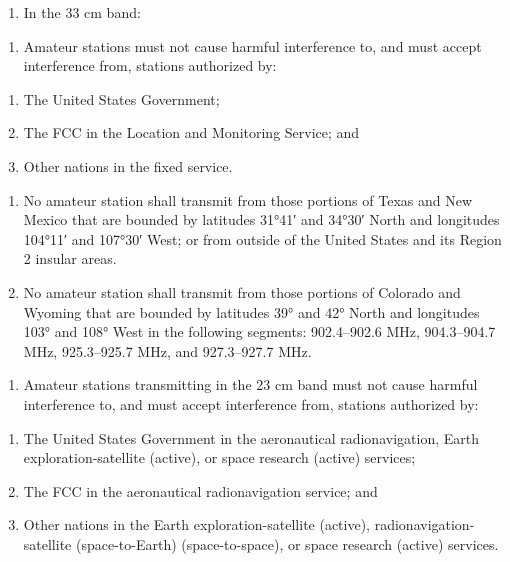 \documentclass[
  letterpaper,
  DIV=11,
  numbers=noendperiod]{scrreport}
\providecommand{\tightlist}{%
  \setlength{\itemsep}{0pt}\setlength{\parskip}{0pt}}\usepackage{longtable,booktabs,array}
\begin{document}
\begin{enumerate}
\def\labelenumi{(\alph{enumi})}
\setcounter{enumi}{13}
\tightlist
\item
  In the 33 cm band:
\end{enumerate}

\begin{enumerate}
\def\labelenumi{(\arabic{enumi})}
\tightlist
\item
  Amateur stations must not cause harmful interference to, and must
  accept interference from, stations authorized by:
\end{enumerate}

\begin{enumerate}
\def\labelenumi{(\roman{enumi})}
\item
  The United States Government;
\item
  The FCC in the Location and Monitoring Service; and
\item
  Other nations in the fixed service.
\end{enumerate}

\begin{enumerate}
\def\labelenumi{(\arabic{enumi})}
\setcounter{enumi}{1}
\item
  No amateur station shall transmit from those portions of Texas and New
  Mexico that are bounded by latitudes 31°41′ and 34°30′ North and
  longitudes 104°11′ and 107°30′ West; or from outside of the United
  States and its Region 2 insular areas.
\item
  No amateur station shall transmit from those portions of Colorado and
  Wyoming that are bounded by latitudes 39° and 42° North and longitudes
  103° and 108° West in the following segments: 902.4--902.6 MHz,
  904.3--904.7 MHz, 925.3--925.7 MHz, and 927.3--927.7 MHz.
\end{enumerate}

\begin{enumerate}
\def\labelenumi{(\alph{enumi})}
\setcounter{enumi}{14}
\tightlist
\item
  Amateur stations transmitting in the 23 cm band must not cause harmful
  interference to, and must accept interference from, stations
  authorized by:
\end{enumerate}

\begin{enumerate}
\def\labelenumi{(\arabic{enumi})}
\item
  The United States Government in the aeronautical radionavigation,
  Earth exploration-satellite (active), or space research (active)
  services;
\item
  The FCC in the aeronautical radionavigation service; and
\item
  Other nations in the Earth exploration-satellite (active),
  radionavigation-satellite (space-to-Earth) (space-to-space), or space
  research (active) services.
\end{enumerate}
\end{document}
